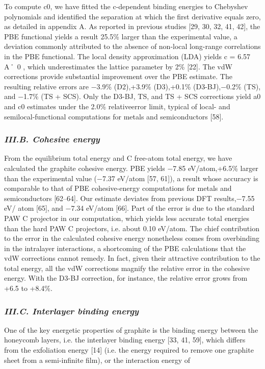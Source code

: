 \documentclass{article}
\begin{document}
To compute c0, we have fitted the c-dependent binding energies to Chebyshev polynomials and identified the separation at which the first derivative equals zero, as detailed in appendix A. As reported in previous studies [29, 30, 32, 41, 42], the PBE functional yields a result 25.5\% larger than the experimental value, a deviation commonly attributed to the absence of non-local long-range correlations in the PBE functional. The local density approximation (LDA) yields c = 6.57 A˚ 0 , which underestimates the lattice parameter by 2\% [22]. The vdW corrections provide substantial improvement over the PBE estimate. The resulting relative errors are −3.9\% (D2),+3.9\% (D3),+0.1\% (D3-BJ),−0.2\% (TS), and −1.7\% (TS + SCS). Only the D3-BJ, TS, and TS + SCS corrections yield a0 and c0 estimates under the 2.0\% relativeerror limit, typical of local- and semilocal-functional computations for metals and semiconductors [58].

\subsubsection{\textit{III.B. Cohesive energy}}

From the equilibrium total energy and C free-atom total energy, we have calculated the graphite cohesive energy. PBE yields −7.85 eV/atom,+6.5\% larger than the experimental value (−7.37 eV/atom [57, 61]), a result whose accuracy is comparable to that of PBE cohesive-energy computations for metals and semiconductors [62–64]. Our estimate deviates from previous DFT results,−7.55 eV/ atom [65], and −7.34 eV/atom [66]. Part of the error is due to the standard PAW C projector in our computation, which yields less accurate total energies than the hard PAW C projectors, i.e. about 0.10 eV/atom. The chief contribution to the error in the calculated cohesive energy nonetheless comes from overbinding in the intralayer interactions, a shortcoming of the PBE calculations that the vdW corrections cannot remedy. In fact, given their attractive contribution to the total energy, all the vdW corrections magnify the relative error in the cohesive energy. With the D3-BJ correction, for instance, the relative error grows from +6.5 to +8.4\%.

\subsubsection{\textit{III.C. Interlayer binding energy}}

One of the key energetic properties of graphite is the binding energy between the honeycomb layers, i.e. the interlayer binding energy [33, 41, 59], which differs from the exfoliation energy [14] (i.e. the energy required to remove one graphite sheet from a semi-infinite film), or the interaction energy of
\end{document}
